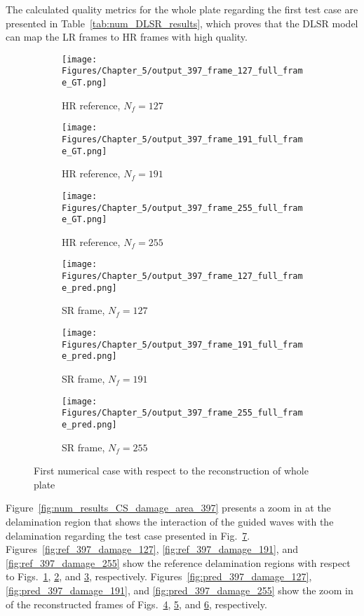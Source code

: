 The calculated quality metrics for the whole plate regarding the first test case are presented in Table~\ref{tab:num_DLSR_results}, which proves that the DLSR model can map the LR frames to HR frames with high quality.
\begin{figure}[!h]
	\centering
	\begin{subfigure}[b]{.32\textwidth}
		\centering
		\texttt{[image: Figures/Chapter\_5/output\_397\_frame\_127\_full\_frame\_GT.png]}
		\caption{HR reference, $N_f=127$}
		\label{fig:ref_397_full_127}
	\end{subfigure}
	\begin{subfigure}[b]{.32\textwidth}
		\centering
		\texttt{[image: Figures/Chapter\_5/output\_397\_frame\_191\_full\_frame\_GT.png]}
		\caption{HR reference, $N_f=191$}
		\label{fig:ref_397_full_191}
	\end{subfigure}
	\begin{subfigure}[b]{.32\textwidth}
		\centering
		\texttt{[image: Figures/Chapter\_5/output\_397\_frame\_255\_full\_frame\_GT.png]}
		\caption{HR reference, $N_f=255$}
		\label{fig:ref_397_full_255}	
	\end{subfigure}
		\begin{subfigure}[b]{.32\textwidth}
		\centering
		\texttt{[image: Figures/Chapter\_5/output\_397\_frame\_127\_full\_frame\_pred.png]}
		\caption{SR frame, $N_f=127$}
		\label{fig:pred_397_full_127}
	\end{subfigure}
	\begin{subfigure}[b]{.32\textwidth}
		\centering
		\texttt{[image: Figures/Chapter\_5/output\_397\_frame\_191\_full\_frame\_pred.png]}
		\caption{SR frame, $N_f=191$}
		\label{fig:pred_397_full_191}
	\end{subfigure}
	\begin{subfigure}[b]{.32\textwidth}
		\centering
		\texttt{[image: Figures/Chapter\_5/output\_397\_frame\_255\_full\_frame\_pred.png]}
		\caption{SR frame, $N_f=255$}
		\label{fig:pred_397_full_255}	
	\end{subfigure}
	\caption{First numerical case with respect to the reconstruction of whole plate}
	\label{fig:num_results_CS_397}
\end{figure}

Figure~\ref{fig:num_results_CS_damage_area_397} presents a zoom in at the delamination region that shows the interaction of the guided waves with the delamination regarding the test case presented in Fig.~\ref{fig:num_results_CS_397}.
Figures~\ref{fig:ref_397_damage_127}, \ref{fig:ref_397_damage_191}, and \ref{fig:ref_397_damage_255} show the reference delamination regions with respect to Figs.~\ref{fig:ref_397_full_127}, \ref{fig:ref_397_full_191}, and \ref{fig:ref_397_full_255}, respectively.
Figures~\ref{fig:pred_397_damage_127}, \ref{fig:pred_397_damage_191}, and \ref{fig:pred_397_damage_255} show the zoom in of the reconstructed frames of Figs.~\ref{fig:pred_397_full_127}, \ref{fig:pred_397_full_191}, and \ref{fig:pred_397_full_255}, respectively.


